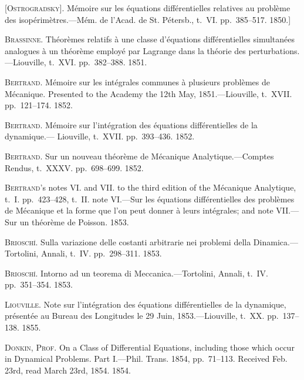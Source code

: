\documentclass[12pt,a4paper]{article}
\theoremstyle{definition}
\begin{document}
\smallskip

\noindent\textsc{[Ostrogradsky]}. M\'emoire sur les \'equations diff\'erentielles relatives au probl\`eme des
isop\'erim\`etres.---M\'em. de l'Acad. de St. P\'etersb., t.~VI. pp.~385--517. 1850.]

\smallskip

\noindent\textsc{Brassinne}. Th\'eor\`emes relatifs \`a une classe d'\'equations diff\'erentielles simultan\'ees analogues
\`a un th\'eor\`eme employ\'e par Lagrange dans la th\'eorie des perturbations.---Liouville,
t.~XVI. pp.~382--388. 1851.

\smallskip

\noindent\textsc{Bertrand}. M\'emoire sur les int\'egrales communes \`a plusieurs probl\`emes de M\'ecanique.
Presented to the Academy the 12th May, 1851.---Liouville, t.~XVII. pp.~121--174.
1852.

\smallskip

\noindent\textsc{Bertrand}. M\'emoire sur l'int\'egration des \'equations diff\'erentielles de la dynamique.---
Liouville, t.~XVII. pp.~393--436. 1852.

\smallskip

\noindent\textsc{Bertrand}. Sur un nouveau th\'eor\`eme de M\'ecanique Analytique.---Comptes Rendus,
t.~XXXV. pp.~698--699. 1852.

\smallskip

\noindent\textsc{Bertrand}'s notes VI. and VII. to the third edition of the M\'ecanique Analytique,
t.~I. pp.~423--428, t.~II. note VI.---Sur les \'equations diff\'erentielles des probl\`emes de
M\'ecanique et la forme que l'on peut donner \`a leurs int\'egrales; and note VII.---
Sur un th\'eor\`eme de Poisson. 1853.

\smallskip

\noindent\textsc{Briosch\'\i}. Sulla variazione delle costanti arbitrarie nei problemi della Dinamica.---
Tortolini, Annali, t.~IV. pp.~298--311. 1853.

\smallskip

\noindent\textsc{Briosch\'\i}. Intorno ad un teorema di Meccanica.---Tortolini, Annali, t.~IV. pp.~351--354.
1853.

\smallskip

\noindent\textsc{Liouville}. Note sur l'int\'egration des \'equations diff\'erentielles de la dynamique, pr\'esent\'ee
au Bureau des Longitudes le 29 Juin, 1853.---Liouville, t.~XX. pp.~137--138. 1855.

\smallskip

\noindent\textsc{Donkin, Prof.} On a Class of Differential Equations, including those which occur in
Dynamical Problems. Part I.---Phil. Trans. 1854, pp.~71--113. Received Feb. 23rd,
read March 23rd, 1854. 1854.
\end{document}
